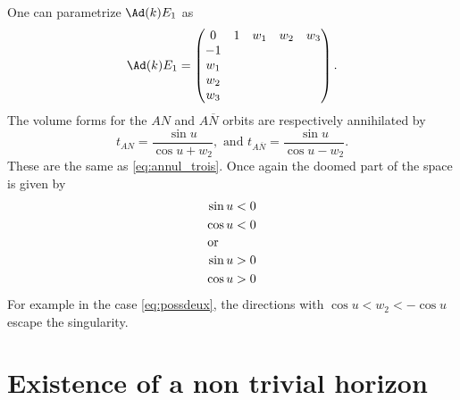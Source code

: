 One can parametrize $\Ad(k)E_1$ as
\begin{equation}
	\Ad(k)E_1=
	\begin{pmatrix}
		0 & 1 & w_1 & w_2 & w_3 \\
		-1                      \\
		w_1                     \\
		w_2                     \\
		w_3
	\end{pmatrix}.
\end{equation}
The volume forms for the $AN$ and $A \overline{N}$ orbits are respectively annihilated by
\begin{equation}
	t_{AN}=\frac{\sin u}{\cos u+w_2}, \text{ and } t_{A \overline{N}}=\frac{\sin u}{\cos u-w_2}.
\end{equation}
These are the same as \eqref{eq:annul_trois}. Once again the doomed part of the space is given by
\begin{subequations}
	\begin{align}
		\begin{split}
			\sin u<0\\
			\cos u<0
		\end{split} \\
		\intertext{or}
		\begin{split}  \label{eq:possdeux}
			\sin u>0\\
			\cos u>0
		\end{split}
	\end{align}
\end{subequations}
For example in the case \eqref{eq:possdeux}, the directions with $\cos u<w_2<-\cos u$ escape the singularity.
\section{Existence of a non trivial horizon}		\label{SecExistenceHor}


